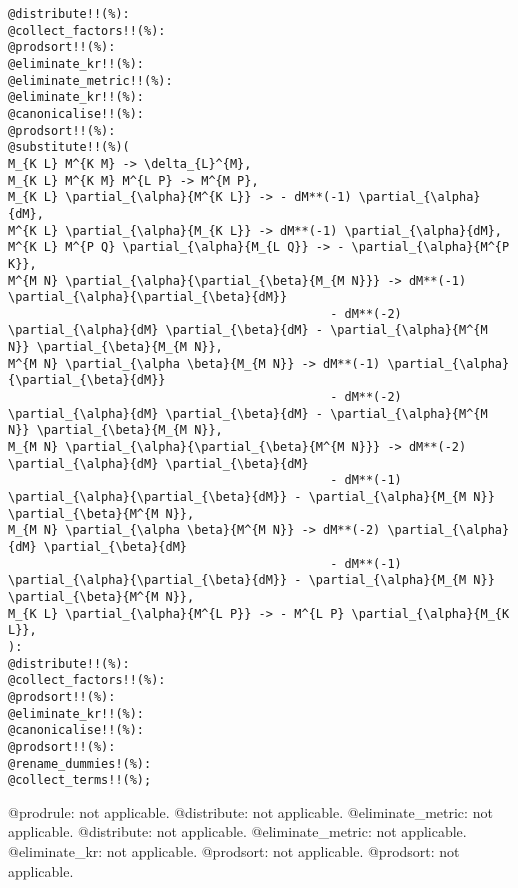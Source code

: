 \documentclass[11pt]{article}
\begin{document}
{\begin{verbatim}
@distribute!!(%):
@collect_factors!!(%):
@prodsort!!(%):
@eliminate_kr!!(%):
@eliminate_metric!!(%):
@eliminate_kr!!(%):
@canonicalise!!(%):
@prodsort!!(%):
@substitute!!(%)(
M_{K L} M^{K M} -> \delta_{L}^{M},
M_{K L} M^{K M} M^{L P} -> M^{M P},
M_{K L} \partial_{\alpha}{M^{K L}} -> - dM**(-1) \partial_{\alpha}{dM},
M^{K L} \partial_{\alpha}{M_{K L}} -> dM**(-1) \partial_{\alpha}{dM},
M^{K L} M^{P Q} \partial_{\alpha}{M_{L Q}} -> - \partial_{\alpha}{M^{P K}},
M^{M N} \partial_{\alpha}{\partial_{\beta}{M_{M N}}} -> dM**(-1) \partial_{\alpha}{\partial_{\beta}{dM}}
                                             - dM**(-2) \partial_{\alpha}{dM} \partial_{\beta}{dM} - \partial_{\alpha}{M^{M N}} \partial_{\beta}{M_{M N}},
M^{M N} \partial_{\alpha \beta}{M_{M N}} -> dM**(-1) \partial_{\alpha}{\partial_{\beta}{dM}}
                                             - dM**(-2) \partial_{\alpha}{dM} \partial_{\beta}{dM} - \partial_{\alpha}{M^{M N}} \partial_{\beta}{M_{M N}},
M_{M N} \partial_{\alpha}{\partial_{\beta}{M^{M N}}} -> dM**(-2) \partial_{\alpha}{dM} \partial_{\beta}{dM}
                                             - dM**(-1) \partial_{\alpha}{\partial_{\beta}{dM}} - \partial_{\alpha}{M_{M N}} \partial_{\beta}{M^{M N}},
M_{M N} \partial_{\alpha \beta}{M^{M N}} -> dM**(-2) \partial_{\alpha}{dM} \partial_{\beta}{dM}
                                             - dM**(-1) \partial_{\alpha}{\partial_{\beta}{dM}} - \partial_{\alpha}{M_{M N}} \partial_{\beta}{M^{M N}},
M_{K L} \partial_{\alpha}{M^{L P}} -> - M^{L P} \partial_{\alpha}{M_{K L}},
):
@distribute!!(%):
@collect_factors!!(%):
@prodsort!!(%):
@eliminate_kr!!(%):
@canonicalise!!(%):
@prodsort!!(%):
@rename_dummies!(%):
@collect_terms!!(%);
\end{verbatim}}
@prodrule: not applicable.
@distribute: not applicable.
@eliminate\_metric: not applicable.
@distribute: not applicable.
@eliminate\_metric: not applicable.
@eliminate\_kr: not applicable.
@prodsort: not applicable.
@prodsort: not applicable.
\end{document}
